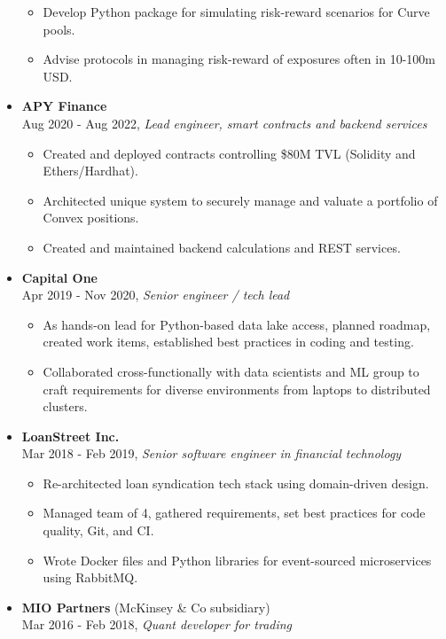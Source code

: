 \documentclass[margin]{res}
\def\tightlist{}
\begin{document}
\begin{resume}
\begin{itemize}
  \begin{itemize}
  \tightlist
  \item
    Develop Python package for simulating risk-reward scenarios for
    Curve pools.
  \item
    Advise protocols in managing risk-reward of exposures often in
    10-100m USD.
  \end{itemize}
\item
  \textbf{APY Finance}\\
  Aug 2020 - Aug 2022, \emph{Lead engineer, smart contracts and backend
  services}

  \begin{itemize}
  \tightlist
  \item
    Created and deployed contracts controlling \$80M TVL (Solidity and
    Ethers/Hardhat).
  \item
    Architected unique system to securely manage and valuate a portfolio
    of Convex positions.
  \item
    Created and maintained backend calculations and REST services.
  \end{itemize}
\item
  \textbf{Capital One}\\
  Apr 2019 - Nov 2020, \emph{Senior engineer / tech lead}

  \begin{itemize}
  \tightlist
  \item
    As hands-on lead for Python-based data lake access, planned roadmap,
    created work items, established best practices in coding and
    testing.
  \item
    Collaborated cross-functionally with data scientists and ML group to
    craft requirements for diverse environments from laptops to
    distributed clusters.
  \end{itemize}
\item
  \textbf{LoanStreet Inc.}\\
  Mar 2018 - Feb 2019, \emph{Senior software engineer in financial
  technology}

  \begin{itemize}
  \tightlist
  \item
    Re-architected loan syndication tech stack using domain-driven
    design.
  \item
    Managed team of 4, gathered requirements, set best practices for
    code quality, Git, and CI.
  \item
    Wrote Docker files and Python libraries for event-sourced
    microservices using RabbitMQ.
  \end{itemize}
\item
  \textbf{MIO Partners} (McKinsey \& Co subsidiary)\\
  Mar 2016 - Feb 2018, \emph{Quant developer for trading}


\end{itemize}
\end{resume}
\end{document}
